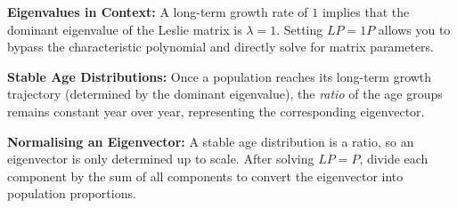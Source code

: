 \begin{takeaways}
\item \textbf{Eigenvalues in Context:} A long-term growth rate of $1$ implies that the dominant eigenvalue of the Leslie matrix is $\lambda = 1$. Setting $LP = 1P$ allows you to bypass the characteristic polynomial and directly solve for matrix parameters.
\item \textbf{Stable Age Distributions:} Once a population reaches its long-term growth trajectory (determined by the dominant eigenvalue), the \textit{ratio} of the age groups remains constant year over year, representing the corresponding eigenvector.
\item \textbf{Normalising an Eigenvector:} A stable age distribution is a ratio, so an eigenvector is only determined up to scale. After solving $LP=P$, divide each component by the sum of all components to convert the eigenvector into population proportions.
\end{takeaways}


